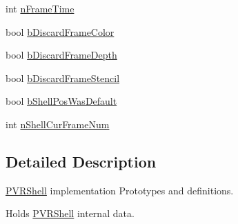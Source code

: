 \begin{DoxyCompactItemize}
\item 
int \hyperlink{struct_p_v_r_shell_data_a2ec6998a67e0984762132b46bc86ced5}{n\+Frame\+Time}
\item 
bool \hyperlink{struct_p_v_r_shell_data_a44f3ba725085dc2c7e59c568ecbc467d}{b\+Discard\+Frame\+Color}
\item 
bool \hyperlink{struct_p_v_r_shell_data_a634ac2c58169dce20fcdc4456fc3a346}{b\+Discard\+Frame\+Depth}
\item 
bool \hyperlink{struct_p_v_r_shell_data_a968b0e95ccd13de9e311f55eb9199304}{b\+Discard\+Frame\+Stencil}
\item 
bool \hyperlink{struct_p_v_r_shell_data_aeeb549968c28f17dc93cd2fd6007cf63}{b\+Shell\+Pos\+Was\+Default}
\item 
int \hyperlink{struct_p_v_r_shell_data_afba037b54135c062a74c42a5bd7388dc}{n\+Shell\+Cur\+Frame\+Num}
\end{DoxyCompactItemize}


\subsection{Detailed Description}
\hyperlink{class_p_v_r_shell}{P\+V\+R\+Shell} implementation Prototypes and definitions. 

Holds \hyperlink{class_p_v_r_shell}{P\+V\+R\+Shell} internal data.



 

